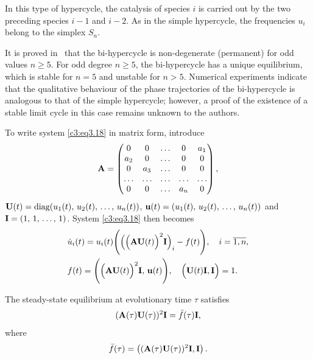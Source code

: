 \documentclass[12pt]{report}
\DeclareMathOperator{\diag}{diag}
\theoremstyle{definition}
\theoremstyle{remark}
\begin{document}
In this type of hypercycle, the catalysis of species $i$ is carried out by the two preceding species $i - 1$ and $i - 2$. As in the simple hypercycle, the frequencies $u_{i}$ belong to the simplex $S_{n}$.

It is proved in~\cite{c3:Safro2013} that the bi-hypercycle is non-degenerate (permanent) for odd values $n \geqslant 5$. For odd degree $n \geqslant 5$, the bi-hypercycle has a unique equilibrium, which is stable for $n = 5$ and unstable for $n > 5$. Numerical experiments indicate that the qualitative behaviour of the phase trajectories of the bi-hypercycle is analogous to that of the simple hypercycle; however, a proof of the existence of a stable limit cycle in this case remains unknown to the authors.

To write system \eqref{c3:eq3.18} in matrix form, introduce
$$
	{\bf A} = 
	\begin{pmatrix}
		0 & 0 & \ldots & 0 & a_{1}\\
		a_{2} & 0 & \ldots & 0 & 0\\
		0 & a_{3} & \ldots & 0 & 0\\
		\ldots & \ldots & \ldots & \ldots & \ldots\\
		0 & 0 & \ldots & a_{n} & 0\\
	\end{pmatrix},
$$ 
${\bf U}(t) = \diag(u_{1}(t),\, u_{2}(t),\, \ldots,\, u_{n}(t))$, ${\bf u}(t) = (u_{1}(t),\, u_{2}(t),\, \ldots,\, u_{n}(t))$ and ${\bf I} = (1,\, 1,\, \ldots,\, 1)$. System \eqref{c3:eq3.18} then becomes
\begin{equation}
	\begin{aligned}	
		&\dot{u}_{i}(t) = u_{i}(t)\Bigg(\Big(\Big({\bf AU}(t)\Big)^{2}{\bf I}\Big)_{i} - f(t)\Bigg), \quad i = \overline{1, n}, \\
		&f(t) = \Bigg(\Big({\bf AU}(t)\Big)^{2}{\bf I},\, {\bf u}(t)\Bigg), \quad \Big({\bf U}(t){\bf I}, {\bf I}\Big) = 1.\\
	\end{aligned}
	\label{c3:eq3.19}
\end{equation}

The steady-state equilibrium at evolutionary time $\tau$ satisfies
\begin{equation}\label{c3:eq3.20}
	({\bf A}(\tau){\bf U}(\tau))^2{\bf I}=\bar{f}(\tau){\bf I},
\end{equation}
where
\begin{equation}\label{c3:eq3.21}
	\bar{f}(\tau) = \left(({\bf A}(\tau){\bf U}(\tau))^2{\bf I}, {\bf I}\right).
\end{equation}
\end{document}
